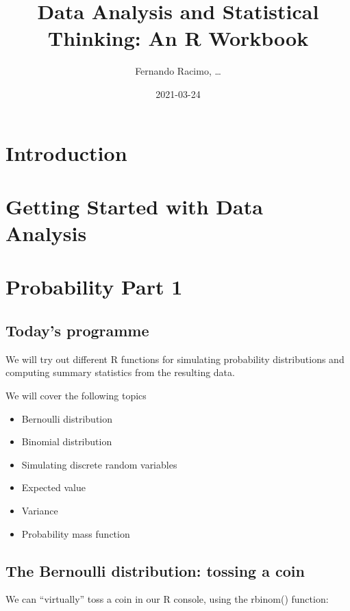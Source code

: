 \documentclass[
]{book}
\title{Data Analysis and Statistical Thinking: An R Workbook}
\author{Fernando Racimo, \ldots{}}
\date{2021-03-24}
\providecommand{\tightlist}{%
  \setlength{\itemsep}{0pt}\setlength{\parskip}{0pt}}
\begin{document}
\maketitle

{
\setcounter{tocdepth}{1}
\tableofcontents
}
\hypertarget{introduction}{%
\chapter{Introduction}\label{introduction}}

\hypertarget{intro}{%
\chapter{Getting Started with Data Analysis}\label{intro}}

\hypertarget{prob1}{%
\chapter{Probability Part 1}\label{prob1}}

\hypertarget{todays-programme}{%
\section{Today's programme}\label{todays-programme}}

We will try out different R functions for simulating probability distributions and computing summary statistics from the resulting data.

We will cover the following topics

\begin{itemize}
\tightlist
\item
  Bernoulli distribution
\item
  Binomial distribution
\item
  Simulating discrete random variables
\item
  Expected value
\item
  Variance
\item
  Probability mass function
\end{itemize}

\hypertarget{the-bernoulli-distribution-tossing-a-coin}{%
\section{The Bernoulli distribution: tossing a coin}\label{the-bernoulli-distribution-tossing-a-coin}}

We can ``virtually'' toss a coin in our R console, using the rbinom() function:
\end{document}
